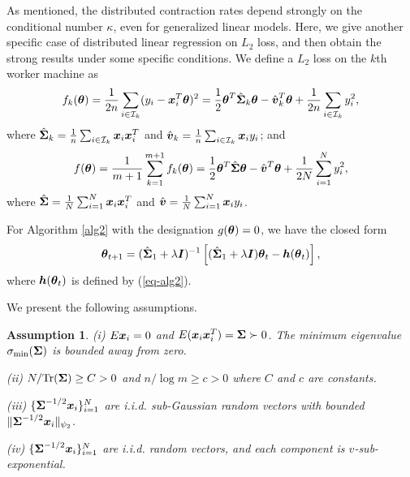 \documentclass[12pt,a4paper]{article}%
\newtheorem{ass}{Assumption}[section]
\newcommand{\be}{\begin{equation}}
\newcommand{\ee}{\end{equation}}
\newcommand \vc[1]{{\mbox{\boldmath${#1}$}}}
\newcommand \vtheta{\vc \theta}
\numberwithin{equation}{section}
\newcommand{\mbr}[1]{\left[#1\right]}        %
\begin{document}
As mentioned, the distributed contraction rates depend strongly on the conditional number $\kappa$, even for generalized linear models. Here, we give another specific case of distributed linear regression on $L_2$ loss, and then obtain the strong results under some specific conditions. We define a $L_2$ loss on the $k$th worker machine as
$$f_k(\vtheta)=\frac{1}{2n}\sum_{i\in\mathcal{I}_k}(y_i-\vc x_i^T\vtheta)^2=\frac{1}{2}\vtheta^T \hat{\vc\Sigma}_k\vtheta-\hat{\vc v}_k^T\vtheta+\frac{1}{2n}\sum_{i\in\mathcal{I}_k}y_i^2,$$
where $\hat{\vc \Sigma}_k=\frac{1}{n}\sum_{i\in\mathcal{I}_k}\vc x_i\vc x_i^T$ and $\hat{\vc v}_k=\frac{1}{n}\sum_{i\in\mathcal{I}_k}\vc x_iy_i$; and
$$f(\vtheta)=\frac{1}{m+1}\sum_{k=1}^{m+1}f_k(\vtheta)=\frac{1}{2}\vtheta^T\hat{\vc\Sigma}\vtheta-\hat{\vc v}^T\vtheta+\frac{1}{2N}\sum_{i=1}^Ny_i^2,$$
where $\hat{\vc\Sigma}=\frac{1}{N}\sum_{i=1}^N\vc x_i\vc x_i^T$ and $\hat{\vc v}=\frac{1}{N}\sum_{i=1}^N\vc x_iy_i$.

For Algorithm \ref{alg2} with the designation $g(\vtheta)=0$, we have the closed form
\be\label{eq4-10}
\vtheta_{t+1}=(\hat{\vc\Sigma}_1+\lambda \vc I)^{-1}\mbr{(\hat{\vc\Sigma}_1+\lambda\vc I)\vtheta_t-\vc h(\vtheta_t)},
\ee
where $\vc h(\vtheta_t)$ is defined by (\ref{eq-alg2}).

We present the following assumptions.
\begin{ass}\label{ass-4-1}
(i) $E\vc x_i=0$ and $E(\vc x_i\vc x_i^T)=\vc\Sigma\succ0$. The minimum eigenvalue $\sigma_{\min}(\vc\Sigma)$ is bounded away from zero.

(ii) $N/\mathrm{Tr}(\vc\Sigma)\geq C>0$ and $n/\log m\geq c>0$ where $C$ and $c$ are constants.

(iii) $\{\vc \Sigma^{-1/2}\vc x_i\}_{i=1}^N$ are i.i.d. sub-Gaussian random vectors with bounded $\|\vc \Sigma^{-1/2}\vc x_i\|_{\psi_2}$.

(iv) $\{\vc \Sigma^{-1/2}\vc x_i\}_{i=1}^N$ are i.i.d. random vectors, and each component is $v$-sub-exponential.
\end{ass}
\end{document}
